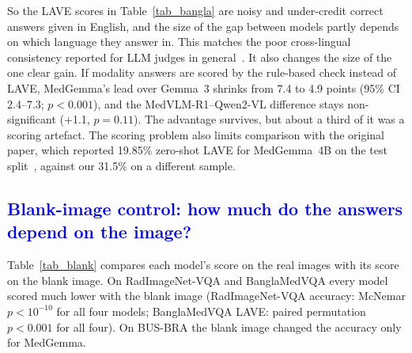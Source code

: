 \documentclass[doublecolumn]{ijcvsplatex}
\newcommand{\qwen}{Qwen2-VL}
\newcommand{\medvlm}{MedVLM-R1}
\newcommand{\gemma}{Gemma~3}
\newcommand{\medgemma}{MedGemma}
\begin{document}
\begin{table}[tb]
\centering
\caption{Audit of LAVE on answers that are correct by a rule-based check. Top: correct English yes/no answers to abnormality questions (an answer starting with ``yes'' or ``no'', e.g.\ ``No abnormality'', or ``There is no abnormality'') and how many the judge credited (LAVE $>0$); \medgemma{}'s five correct Bangla yes/no answers, all credited, are not included. Bottom: correct modality answers (of 100) by keyword matching of X-ray/radiograph, CT, MRI or ultrasound in either language.}
\label{tab_audit}
\footnotesize
\setlength{\tabcolsep}{3pt}
\end{table}

So the LAVE scores in Table~\ref{tab_bangla} are noisy and under-credit correct answers given in English, and the size of the gap between models partly depends on which language they answer in. This matches the poor cross-lingual consistency reported for LLM judges in general~\cite{fu2025multilingualjudge}. It also changes the size of the one clear gain. If modality answers are scored by the rule-based check instead of LAVE, \medgemma{}'s lead over \gemma{} shrinks from 7.4 to 4.9 points (95\% CI 2.4--7.3; $p<0.001$), and the \medvlm{}--\qwen{} difference stays non-significant (+1.1, $p=0.11$). The advantage survives, but about a third of it was a scoring artefact. The scoring problem also limits comparison with the original paper, which reported 19.85\% zero-shot LAVE for \medgemma{}~4B on the test split~\cite{ahmed2026banglamedvqa}, against our 31.5\% on a different sample.

\subsection{\textcolor{blue}{Blank-image control: how much do the answers depend on the image?}}
\label{sec_res_blank}
{\color{blue}
Table~\ref{tab_blank} compares each model's score on the real images with its score on the blank image. On RadImageNet-VQA and BanglaMedVQA every model scored much lower with the blank image (RadImageNet-VQA accuracy: McNemar $p<10^{-10}$ for all four models; BanglaMedVQA LAVE: paired permutation $p<0.001$ for all four). On BUS-BRA the blank image changed the accuracy only for \medgemma{}.
}
\end{document}
